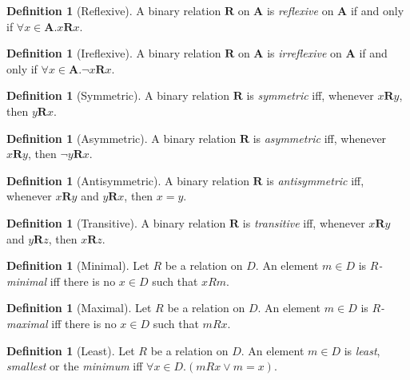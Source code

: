 \documentclass{report}
\theoremstyle{definition}
\newtheorem{definition}[axiom]{Definition}
\begin{document}
    \begin{definition}[Reflexive]
        A binary relation $\mathbf{R}$ on $\mathbf{A}$ is \emph{reflexive} on $\mathbf{A}$ if and only if
        $\forall x \in \mathbf{A}. x\mathbf{R}x$.
    \end{definition}

    \begin{definition}[Ireflexive]
        A binary relation $\mathbf{R}$ on $\mathbf{A}$ is \emph{irreflexive} on $\mathbf{A}$ if and only if
        $\forall x \in \mathbf{A}. \neg x\mathbf{R}x$.
    \end{definition}

    \begin{definition}[Symmetric]
        A binary relation $\mathbf{R}$ is \emph{symmetric} iff, whenever $x\mathbf{R}y$, then $y\mathbf{R}x$.
    \end{definition}

    \begin{definition}[Asymmetric]
        A binary relation $\mathbf{R}$ is \emph{asymmetric} iff, whenever $x\mathbf{R}y$, then $\neg y\mathbf{R}x$.
    \end{definition}

    \begin{definition}[Antisymmetric]
        A binary relation $\mathbf{R}$ is \emph{antisymmetric} iff, whenever $x\mathbf{R}y$ and
        $y \mathbf{R} x$, then $x = y$.
    \end{definition}

    \begin{definition}[Transitive]
        A binary relation $\mathbf{R}$ is \emph{transitive} iff, whenever $x\mathbf{R}y$ and $y\mathbf{R}z$,
        then $x\mathbf{R}z$.
    \end{definition}

    \begin{definition}[Minimal]
        Let $R$ be a relation on $D$. An element $m \in D$ is \emph{$R$-minimal} iff there is no
        $x \in D$ such that $x R m$.
    \end{definition}

    \begin{definition}[Maximal]
        Let $R$ be a relation on $D$. An element $m \in D$ is \emph{$R$-maximal} iff there is no
        $x \in D$ such that $mRx$.
    \end{definition}

    \begin{definition}[Least]
        Let $R$ be a relation on $D$. An element $m \in D$ is \emph{least}, \emph{smallest} or the
        \emph{minimum} iff $\forall x \in D. (m R x \vee m = x)$.
    \end{definition}
\end{document}
